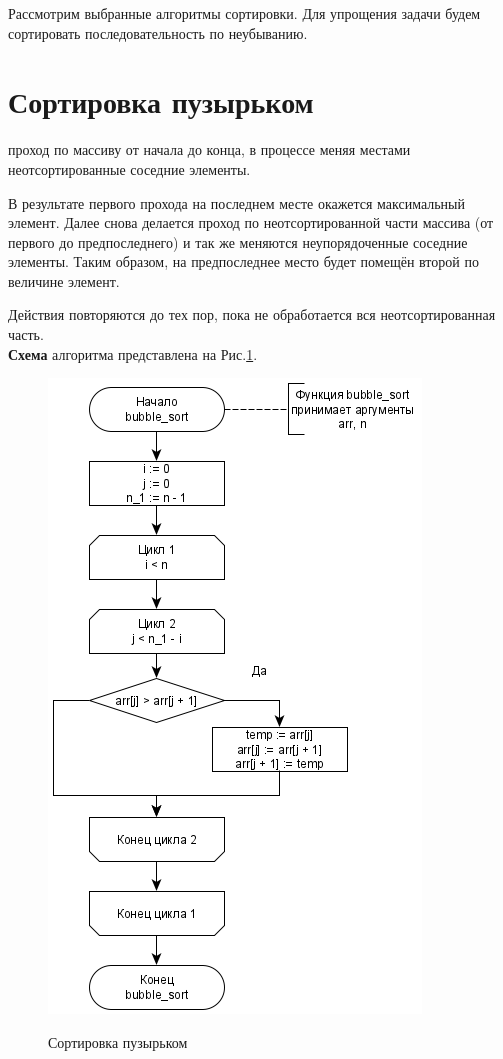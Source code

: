 Рассмотрим выбранные алгоритмы сортировки. Для упрощения задачи будем сортировать последовательность по неубыванию. 
\section{Сортировка пузырьком}
 проход по массиву от начала до конца, в процессе меняя местами неотсортированные соседние элементы.

В результате первого прохода на последнем месте окажется максимальный элемент. Далее снова делается проход по неотсортированной части массива (от первого до предпоследнего) и так же меняются неупорядоченные соседние элементы. Таким образом, на предпоследнее место будет помещён второй по величине элемент.

Действия повторяются до тех пор, пока не обработается вся неотсортированная часть. \\

\textbf{Схема} алгоритма представлена на Рис.\ref{fig1:image}.
\begin{figure}[h]
	\begin{center}
		{\includegraphics[scale = 0.519]{schemes/bubble}}
		\caption{Сортировка пузырьком}
		\label{fig1:image}
	\end{center}
\end{figure}


